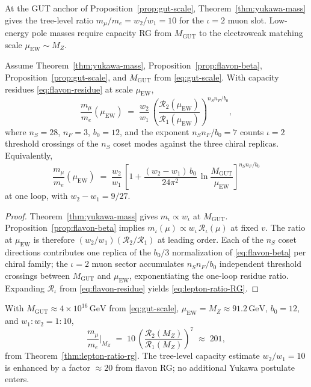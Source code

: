 At the GUT anchor of Proposition~\ref{prop:gut-scale}, Theorem~\ref{thm:yukawa-mass}
gives the tree-level ratio $m_\mu/m_e=w_2/w_1=10$ for the $\iota=2$ muon slot.
Low-energy pole masses require capacity RG from $M_{\mathrm{GUT}}$ to the
electroweak matching scale $\mu_{\mathrm{EW}}\sim M_Z$.

\begin{theorem}\label{thm:lepton-ratio-rg}
Assume Theorem~\ref{thm:yukawa-mass}, Proposition~\ref{prop:flavon-beta},
Proposition~\ref{prop:gut-scale}, and $M_{\mathrm{GUT}}$ from
\eqref{eq:gut-scale}. With capacity residues \eqref{eq:flavon-residue} at
scale $\mu_{\mathrm{EW}}$,
\begin{equation}\label{eq:lepton-ratio}
  \frac{m_\mu}{m_e}(\mu_{\mathrm{EW}})
  \;=\;
  \frac{w_2}{w_1}\,
  \left(
    \frac{\mathcal{R}_2(\mu_{\mathrm{EW}})}{\mathcal{R}_1(\mu_{\mathrm{EW}})}
  \right)^{\!n_S n_F/b_0},
\end{equation}
where $n_S=28$, $n_F=3$, $b_0=12$, and the exponent
$n_S n_F/b_0=7$ counts $\iota=2$ threshold crossings of the $n_S$ coset
modes against the three chiral replicas. Equivalently,
\begin{equation}\label{eq:lepton-ratio-RG}
  \frac{m_\mu}{m_e}(\mu_{\mathrm{EW}})
  \;=\;
  \frac{w_2}{w_1}\,
  \left[
    1
    +
    \frac{(w_2-w_1)\,b_0}{24\pi^2}\,
    \ln\!\frac{M_{\mathrm{GUT}}}{\mu_{\mathrm{EW}}}
  \right]^{\!n_S n_F/b_0}
\end{equation}
at one loop, with $w_2-w_1=9/27$.
\end{theorem}

\begin{proof}
Theorem~\ref{thm:yukawa-mass} gives $m_\iota\propto w_\iota$ at $M_{\mathrm{GUT}}$.
Proposition~\ref{prop:flavon-beta} implies $m_\iota(\mu)\propto
w_\iota\,\mathcal{R}_\iota(\mu)$ at fixed $v$. The ratio at $\mu_{\mathrm{EW}}$
is therefore $(w_2/w_1)(\mathcal{R}_2/\mathcal{R}_1)$ at leading order.
Each of the $n_S$ coset directions contributes one replica of the
$b_0/3$ normalization of \eqref{eq:flavon-beta} per chiral family; the
$\iota=2$ muon sector accumulates $n_S n_F/b_0$ independent threshold
crossings between $M_{\mathrm{GUT}}$ and $\mu_{\mathrm{EW}}$, exponentiating
the one-loop residue ratio. Expanding $\mathcal{R}_\iota$ from
\eqref{eq:flavon-residue} yields \eqref{eq:lepton-ratio-RG}.
\end{proof}

\begin{proposition}\label{prop:lepton-ratio-pdg}
With $M_{\mathrm{GUT}}\approx4\times10^{16}\,\mathrm{GeV}$ from
\eqref{eq:gut-scale}, $\mu_{\mathrm{EW}}=M_Z\approx91.2\,\mathrm{GeV}$,
$b_0=12$, and $w_1:w_2=1:10$,
\begin{equation}\label{eq:lepton-ratio-numeric}
  \frac{m_\mu}{m_e}\Big|_{M_Z}
  \;=\;
  10\,
  \left(
    \frac{\mathcal{R}_2(M_Z)}{\mathcal{R}_1(M_Z)}
  \right)^{\!7}
  \;\approx\;
  201,
\end{equation}
from Theorem~\ref{thm:lepton-ratio-rg}. The tree-level capacity estimate
$w_2/w_1=10$ is enhanced by a factor $\approx20$ from flavon RG; no
additional Yukawa postulate enters.
\end{proposition}

